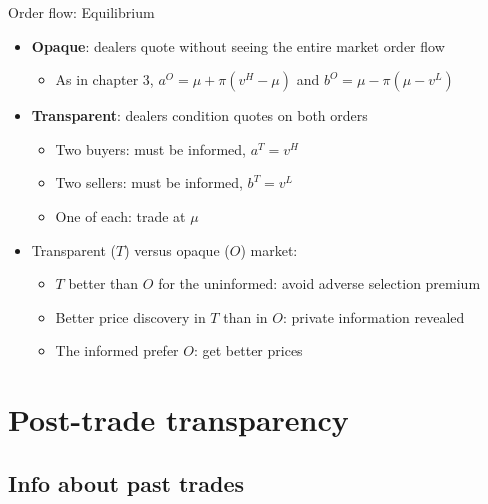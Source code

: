 \documentclass[english,10pt
,aspectratio=169
]{beamer}
\begin{document}
\begin{frame}{Order flow: Equilibrium}
	\begin{itemize}
		\item \textbf{Opaque}: dealers quote without seeing the entire market order flow
		\begin{itemize}
			\item As in chapter 3, $a^{O}=\mu+\pi(v^{H}-\mu)$ and $b^{O}=\mu-\pi(\mu-v^{L})$
		\end{itemize}
		\item \textbf{Transparent}: dealers condition quotes on both orders
		\begin{itemize}
			\item Two buyers: must be informed, $a^{T}=v^{H}$
			\item Two sellers: must be informed, $b^{T}=v^{L}$
			\item One of each: trade at $\mu$
		\end{itemize}
		\item Transparent ($T$) versus opaque ($O$) market:
		\begin{itemize}
			\item $T$ better than $O$ for the uninformed: avoid adverse selection premium
			\item Better price discovery in $T$ than in $O$:  private information revealed
			\item The informed prefer $O$: get better prices
		\end{itemize}
	\end{itemize}
\end{frame}



\section{Post-trade transparency}

\subsection{Info about past trades}
\end{document}
